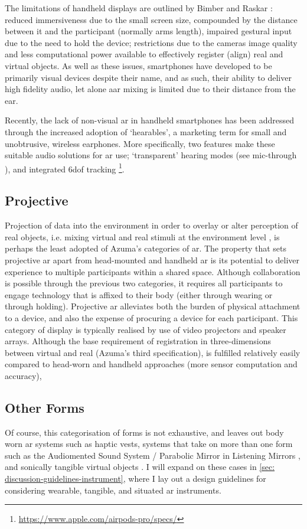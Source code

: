 The limitations of handheld displays are outlined by Bimber and Raskar \citeyearpar[pp. 79-83]{bimber2005}: reduced immersiveness due to the small screen size, compounded by the distance between it and the participant (normally arms length), impaired gestural input due to the need to hold the device; restrictions due to the cameras image quality and less computational power available to effectively register (align) real and virtual objects. As well as these issues, smartphones have developed to be primarily visual devices despite their name, and as such, their ability to deliver high fidelity audio, let alone \gls{aar} mixing is limited due to their distance from the ear. 

Recently, the lack of non-visual \gls{ar} in handheld smartphones has been addressed through the increased adoption of `hearables', a marketing term for small and unobtrusive, wireless earphones. More specifically, two features make these suitable audio solutions for \gls{ar} use; `transparent' hearing modes (see mic-through \citep{lindeman2008}), and integrated \gls{6dof} tracking \footnote{\url{https://www.apple.com/airpods-pro/specs/}}.

\subsection{Projective}\label{sec: ar-forms-proj}
Projection of data into the environment in order to overlay or alter perception of real objects, i.e. mixing virtual and real stimuli at the environment level \citep{lindeman2007}, is perhaps the least adopted of Azuma's categories of \gls{ar}. The property that sets projective \gls{ar} apart from head-mounted and handheld \gls{ar} is its potential to deliver experience to multiple participants within a shared space. Although collaboration is possible through the previous two categories, it requires all participants to engage technology that is affixed to their body (either through wearing or through holding). Projective \gls{ar} alleviates both the burden of physical attachment to a device, and also the expense of procuring a device for each participant. This category of display is typically realised by use of video projectors and speaker arrays. Although the base requirement of registration in three-dimensions between virtual and real (Azuma's third specification), is fulfilled relatively easily compared to head-worn and handheld approaches (more sensor computation and accuracy), 

\subsection{Other Forms}\label{sec: ar-forms-other}
Of course, this categorisation of forms is not exhaustive, and leaves out body worn \gls{ar} systems such as haptic vests, systems that take on more than one form such as the Audiomented Sound System / Parabolic Mirror in Listening Mirrors \citep{chevalier2020}, and sonically tangible virtual objects \citep{schraffenberger2015}. I will expand on these cases in \autoref{sec: discussion-guidelines-instrument}, where I lay out a design guidelines for considering wearable, tangible, and situated \gls{ar} instruments.



